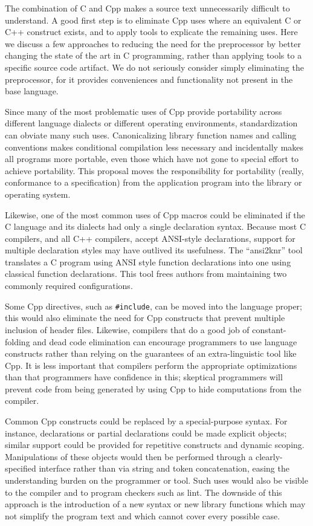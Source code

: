 \documentclass[10pt]{article}
\begin{document}
The combination of C and Cpp makes a source text unnecessarily difficult
to understand.  A good first step is to eliminate Cpp uses where an
equivalent C or C++ construct exists, and to apply tools to explicate
the remaining uses.  Here we discuss a few approaches to reducing the
need for the preprocessor by better changing the state of the art in C
programming, rather than applying tools to a specific source code
artifact.  We do not seriously consider simply eliminating the
preprocessor, for it provides conveniences and functionality not present
in the base language.

Since many of the most problematic uses of Cpp provide portability across
different language dialects or different operating environments,
standardization can obviate many such uses.  Canonicalizing library
function names and calling conventions makes conditional compilation less
necessary and incidentally makes all programs more portable, even those
which have not gone to special effort to achieve portability.  This
proposal moves the responsibility for portability (really, conformance to a
specification) from the application program into the library or operating
system.  

Likewise, one of the most common uses of Cpp macros could be eliminated if
the C language and its dialects had only a single declaration syntax.
Because most C compilers, and all C++ compilers, accept ANSI-style
declarations, support for multiple declaration styles may have outlived its
usefulness.  The ``ansi2knr'' tool~\cite{Deutsch90} translates a C program
using ANSI style function declarations into one using classical function
declarations.  This tool frees authors from maintaining two commonly
required configurations.

Some Cpp directives, such as {\tt \#include}, can be moved into the
language proper; this would also eliminate the need for Cpp constructs that
prevent multiple inclusion of header files.  Likewise, compilers that do a
good job of constant-folding and dead code elimination can encourage
programmers to use language constructs rather than relying on the
guarantees of an extra-linguistic tool like Cpp.  It is less important that
compilers perform the appropriate optimizations than that programmers have
confidence in this; skeptical programmers will prevent code from being
generated by using Cpp to hide computations from the compiler.

Common Cpp constructs could be replaced by a special-purpose syntax.  For
instance, declarations or partial declarations could be made explicit
objects; similar support could be provided for repetitive constructs and
dynamic scoping.  Manipulations of these objects would then be performed
through a clearly-specified interface rather than via string and token
concatenation, easing the understanding burden on the programmer or tool.
Such uses would also be visible to the compiler and to program checkers
such as lint.  The downside of this approach is the introduction of a new
syntax or new library functions which may not simplify the program text and
which cannot cover every possible case.
\end{document}
